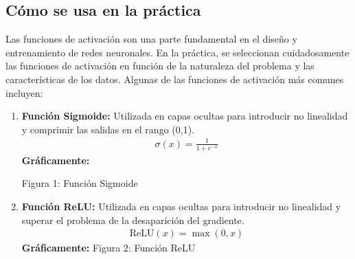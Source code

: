\documentclass[11pt, a4paper]{article}
\begin{document}
\subsection{Cómo se usa en la práctica}
Las funciones de activación son una parte fundamental en el diseño y entrenamiento de redes neuronales. En la práctica, se seleccionan cuidadosamente las funciones de activación en función de la naturaleza del problema y las características de los datos. Algunas de las funciones de activación más comunes incluyen:
\begin{enumerate}
  \item \textbf{Función Sigmoide:} Utilizada en capas ocultas para introducir no linealidad y comprimir las salidas en el rango (0,1).
  \begin{align*}
    \sigma(x) = \frac{1}{1 + e^{-x}}
  \end{align*}
  \textbf{Gráficamente:} 

  Figura 1: Función Sigmoide
  \begin{center}
  \end{center}
  \item \textbf{Función ReLU:} Utilizada en capas ocultas para introducir no linealidad y superar el problema de la desaparición del gradiente.
  \begin{align*}
    \text{ReLU}(x) = \max(0, x)
  \end{align*}
  \textbf{Gráficamente:}
  Figura 2: Función ReLU
  \begin{center}
\end{center}
\end{enumerate}
\end{document}
